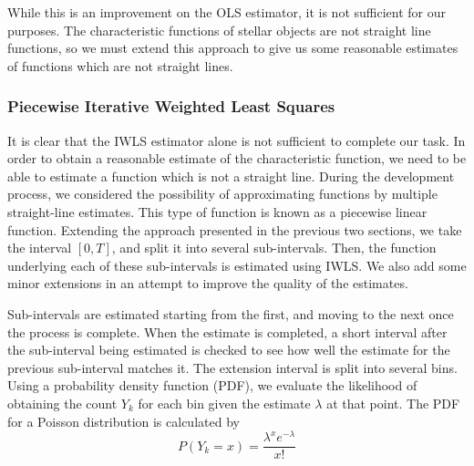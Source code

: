 \documentclass[a4paper,11pt]{article}
\begin{document}
    While this is an improvement on the OLS estimator, it is not sufficient for
    our purposes. The characteristic functions of stellar objects are not
    straight line functions, so we must extend this approach to give us some
    reasonable estimates of functions which are not straight lines.
\subsubsection{Piecewise Iterative Weighted Least Squares}
\label{sec-4-1-3}

    It is clear that the IWLS estimator alone is not sufficient to complete our
    task. In order to obtain a reasonable estimate of the characteristic
    function, we need to be able to estimate a function which is not a straight
    line. During the development process, we considered the possibility of
    approximating functions by multiple straight-line estimates. This type of
    function is known as a piecewise linear function. Extending the approach
    presented in the previous two sections, we take the interval $[0,T]$, and
    split it into several sub-intervals. Then, the function underlying each of
    these sub-intervals is estimated using IWLS. We also add some minor
    extensions in an attempt to improve the quality of the estimates.

    Sub-intervals are estimated starting from the first, and moving to the next
    once the process is complete. When the estimate is completed, a short
    interval after the sub-interval being estimated is checked to see how well
    the estimate for the previous sub-interval matches it. The extension
    interval is split into several bins. Using a probability density function
    (PDF), we evaluate the likelihood of obtaining the count $Y_k$ for each bin
    given the estimate $\lambda$ at that point. The PDF for a Poisson
    distribution is calculated by
    \begin{equation}
    P(Y_k=x)=\frac{\lambda^xe^{-\lambda}}{x!}
    \end{equation}
    
\end{document}

